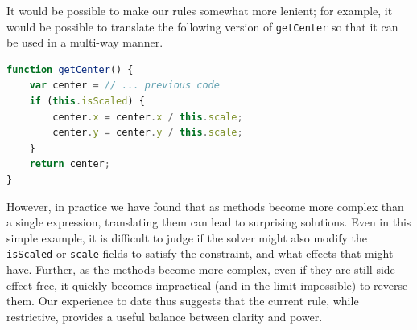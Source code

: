 \documentclass[10pt,reprint]{sigplanconf-preprint}
\newcommand{\ac}[1]{\gls*{#1}}
\begin{document}
It would be possible to make our rules somewhat more lenient; for example, it
would be possible to translate the following version of
\verb!getCenter! so that it can be used in a multi-way manner.
\begin{lstlisting}[language=JavaScript,caption={~},label=lst:otherGetCenter]
function getCenter() {
    var center = // ... previous code
    if (this.isScaled) {
        center.x = center.x / this.scale;
        center.y = center.y / this.scale;
    }
    return center;
}
\end{lstlisting}
However, in practice we have found that as methods become more complex
than a single expression, translating them can lead to surprising
solutions.  Even in this simple example, it is difficult to judge if
the solver might also modify the \verb!isScaled! or \verb!scale!
fields to satisfy the constraint, and what effects that might
have.  Further, as the methods become more complex, even if they are
still side-effect-free, it quickly becomes impractical (and in the limit
impossible) to reverse them.
Our experience to date thus suggests that the current rule,
while restrictive, provides a useful balance between clarity and power.



\end{document}
